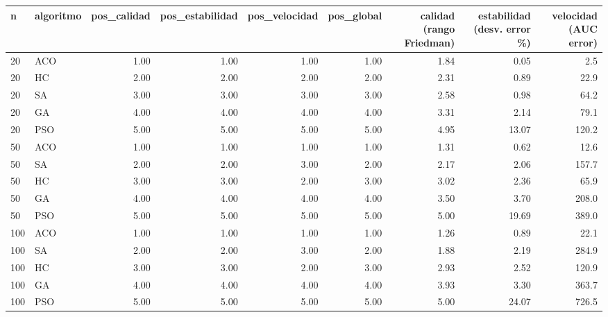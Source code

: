 \begin{tabular}{llrrrrrrr}
\toprule
n & algoritmo & pos\_calidad & pos\_estabilidad & pos\_velocidad & pos\_global & calidad (rango Friedman) & estabilidad (desv. error \%) & velocidad (AUC error) \\
\midrule
20 & ACO & 1.00 & 1.00 & 1.00 & 1.00 & 1.84 & 0.05 & 2.5 \\
20 & HC & 2.00 & 2.00 & 2.00 & 2.00 & 2.31 & 0.89 & 22.9 \\
20 & SA & 3.00 & 3.00 & 3.00 & 3.00 & 2.58 & 0.98 & 64.2 \\
20 & GA & 4.00 & 4.00 & 4.00 & 4.00 & 3.31 & 2.14 & 79.1 \\
20 & PSO & 5.00 & 5.00 & 5.00 & 5.00 & 4.95 & 13.07 & 120.2 \\
\midrule
50 & ACO & 1.00 & 1.00 & 1.00 & 1.00 & 1.31 & 0.62 & 12.6 \\
50 & SA & 2.00 & 2.00 & 3.00 & 2.00 & 2.17 & 2.06 & 157.7 \\
50 & HC & 3.00 & 3.00 & 2.00 & 3.00 & 3.02 & 2.36 & 65.9 \\
50 & GA & 4.00 & 4.00 & 4.00 & 4.00 & 3.50 & 3.70 & 208.0 \\
50 & PSO & 5.00 & 5.00 & 5.00 & 5.00 & 5.00 & 19.69 & 389.0 \\
\midrule
100 & ACO & 1.00 & 1.00 & 1.00 & 1.00 & 1.26 & 0.89 & 22.1 \\
100 & SA & 2.00 & 2.00 & 3.00 & 2.00 & 1.88 & 2.19 & 284.9 \\
100 & HC & 3.00 & 3.00 & 2.00 & 3.00 & 2.93 & 2.52 & 120.9 \\
100 & GA & 4.00 & 4.00 & 4.00 & 4.00 & 3.93 & 3.30 & 363.7 \\
100 & PSO & 5.00 & 5.00 & 5.00 & 5.00 & 5.00 & 24.07 & 726.5 \\
\bottomrule
\end{tabular}
